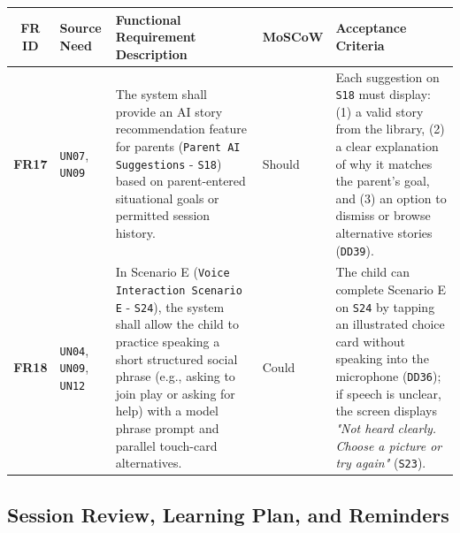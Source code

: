 \begin{footnotesize}
\noindent\begin{xltabular}{\textwidth}{|c|p{2.2cm}|X|p{2.0cm}|p{2.4cm}|}
\hline
\textbf{FR ID} & \textbf{Source Need} & \textbf{Functional Requirement Description} & \textbf{MoSCoW} & \textbf{Acceptance Criteria} \\ \hline
\endhead
\textbf{FR17} & \texttt{UN07}, \texttt{UN09} & The system shall provide an AI story recommendation feature for parents (\texttt{Parent AI Suggestions} - \texttt{S18}) based on parent-entered situational goals or permitted session history. & Should & Each suggestion on \texttt{S18} must display: (1) a valid story from the library, (2) a clear explanation of why it matches the parent's goal, and (3) an option to dismiss or browse alternative stories (\texttt{DD39}). \\ \hline
\textbf{FR18} & \texttt{UN04}, \texttt{UN09}, \texttt{UN12} & In Scenario E (\texttt{Voice Interaction Scenario E} - \texttt{S24}), the system shall allow the child to practice speaking a short structured social phrase (e.g., asking to join play or asking for help) with a model phrase prompt and parallel touch-card alternatives. & Could & The child can complete Scenario E on \texttt{S24} by tapping an illustrated choice card without speaking into the microphone (\texttt{DD36}); if speech is unclear, the screen displays \textit{"Not heard clearly. Choose a picture or try again"} (\texttt{S23}). \\ \hline
\end{xltabular}
\end{footnotesize}



\subsection{Session Review, Learning Plan, and Reminders}


